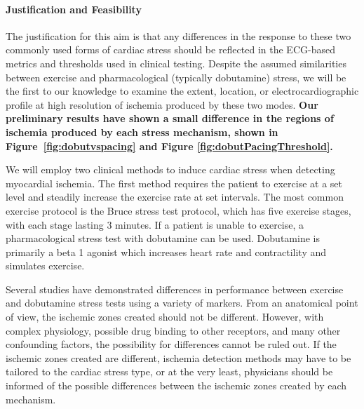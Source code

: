 \paragraph{Justification and Feasibility} The justification for this aim is that any differences in the response to these two commonly used forms of cardiac stress should be reflected in the ECG-based metrics and thresholds used in clinical testing.  Despite the assumed similarities between exercise and pharmacological (typically dobutamine) stress, we will be the first to our knowledge to examine the extent, location, or electrocardiographic profile at high resolution of ischemia produced by these two modes. \textbf{Our preliminary results have shown a small difference in the regions of ischemia produced by each stress mechanism, shown in  Figure~\ref{fig:dobutvspacing} and Figure \ref{fig:dobutPacingThreshold}.}

 We will employ two clinical methods to induce cardiac stress when detecting myocardial ischemia. The first method requires the patient to exercise at a set level and steadily  increase the exercise rate at set intervals.\cite{BLZ:Oki1986} The most common exercise protocol is the Bruce stress test protocol, which has five exercise stages, with each stage lasting 3 minutes.\cite{BLZ:GOL1976,BLZ:Bru1963,BLZ:Oki1986} If a patient is unable to exercise, a pharmacological stress test with dobutamine can be used.\cite{BLZ:SAL1992,BLZ:Gre1997,BLZ:Man1988} Dobutamine is primarily a beta 1 agonist which increases heart rate and contractility and simulates exercise. 

Several studies have demonstrated differences in performance between exercise and dobutamine stress tests using a variety of markers.  From an anatomical point of view, the ischemic zones created should not be different. However, with complex physiology, possible drug binding to other receptors, and many other confounding factors, the possibility for differences cannot be ruled out. If the ischemic zones created are different, ischemia detection methods may have to be tailored to the cardiac stress type, or at the very least, physicians should be informed of the possible differences between the ischemic zones created by each mechanism.  

